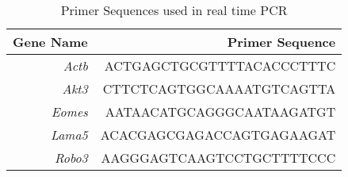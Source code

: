 \begin{table}[htbp]
  \centering
  \caption{Primer Sequences used in real time PCR}
    \begin{tabular}{rr}
    \toprule
    Gene Name & Primer Sequence \\
    \midrule
    \textit{Actb}  & ACTGAGCTGCGTTTTACACCCTTTC \\
    \textit{Akt3}  & CTTCTCAGTGGCAAAATGTCAGTTA \\
    \textit{Eomes} & AATAACATGCAGGGCAATAAGATGT \\
    \textit{Lama5} & ACACGAGCGAGACCAGTGAGAAGAT \\
    \textit{Robo3} & AAGGGAGTCAAGTCCTGCTTTTCCC \\
    \bottomrule
    \end{tabular}%
  \label{suppleTab:rtPCR}%
\end{table}%
